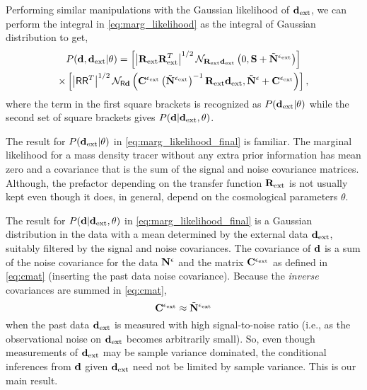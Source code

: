 \documentclass[11pt, letterpaper]{article}
\begin{document}
Performing similar manipulations with the Gaussian likelihood of $\mathbf{d}_{\rm ext}$, we can
perform the integral in \autoref{eq:marg_likelihood} as the integral of Gaussian distribution to get,
\begin{multline}\label{eq:marg_likelihood_final}
	P(\mathbf{d}, \mathbf{d}_{\rm ext} | \theta) =
	\left[
	\left|\mathbf{R}_{\rm ext}\mathbf{R}_{\rm ext}^{T}\right|^{1/2}
	\mathcal{N}_{\mathbf{R}_{\rm ext}\mathbf{d}_{\rm ext}} \left(0, \mathbf{S} + \tilde{\mathbf{N}}^{\epsilon_{\rm ext}}\right)
	\right]
	\\ \times
	\left[
	\left|\mathsf{R}\mathsf{R}^{T}\right|^{1/2}
	\mathcal{N}_{\mathsf{R}\mathbf{d}} \left(\mathbf{C}^{\epsilon_{\rm ext}}\left(\tilde{\mathbf{N}}^{\epsilon_{\rm ext}}\right)^{-1}\mathbf{R}_{\rm ext}\mathbf{d}_{\rm ext},
	\tilde{\mathbf{N}}^{\epsilon} + \mathbf{C}^{\epsilon_{\rm ext}}\right)
	\right],
\end{multline}
where the term in the first square brackets is recognized as $P(\mathbf{d}_{\rm ext} | \theta)$ while the
second set of square brackets gives $P(\mathbf{d} | \mathbf{d}_{\rm ext}, \theta)$.

The result for $P(\mathbf{d}_{\rm ext}|\theta)$ in \autoref{eq:marg_likelihood_final} is familiar. The
marginal likelihood for a mass density tracer without any extra prior information has mean zero
and a covariance that is the sum of the signal and noise covariance matrices. Although, the
prefactor depending on the transfer function $\mathbf{R}_{\rm ext}$ is not usually kept even though it
does, in general, depend on the cosmological parameters $\theta$.

The result for $P(\mathbf{d}|\mathbf{d}_{\rm ext},\theta)$ in \autoref{eq:marg_likelihood_final} is a Gaussian
distribution in the data with a mean determined by the external data $\mathbf{d}_{\rm ext}$, suitably filtered
by the signal and noise covariances. The covariance of $\mathbf{d}$ is a sum
of the noise covariance for the data $\mathbf{N}^{\epsilon}$ and the matrix $\mathbf{C}^{\epsilon_{\rm ext}}$ as defined in
\autoref{eq:cmat} (inserting the past data noise covariance). Because the \emph{inverse}
covariances are summed in \autoref{eq:cmat},
\begin{equation}
	\mathbf{C}^{\epsilon_{\rm ext}} \approx \tilde{\mathbf{N}}^{\epsilon_{\rm ext}}
\end{equation}
when the past data $\mathbf{d}_{\rm ext}$ is measured with high signal-to-noise ratio (i.e., as the observational
noise on $\mathbf{d}_{\rm ext}$ becomes arbitrarily small). So, even though measurements of $\mathbf{d}_{\rm ext}$ may be
sample variance dominated, the conditional inferences from $\mathbf{d}$ given $\mathbf{d}_{\rm ext}$ need not be
limited by sample variance. This is our main result.

\end{document}
